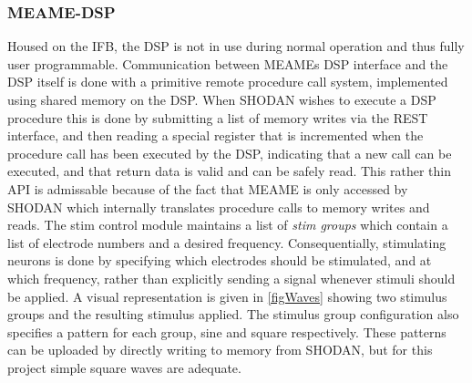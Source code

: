 \subsubsection{MEAME-DSP}
Housed on the IFB, the DSP is not in use during normal operation and thus fully
user programmable.
Communication between MEAMEs DSP interface and the DSP itself is done with a
primitive remote procedure call system, implemented using shared memory on the
DSP.
When SHODAN wishes to execute a DSP procedure this is done by submitting a list
of memory writes via the REST interface, and then reading a special register
that is incremented when the procedure call has been executed by the DSP,
indicating that a new call can be executed, and that return data is valid and
can be safely read.
This rather thin API is admissable because of the fact that MEAME is only
accessed by SHODAN which internally translates procedure calls to memory writes
and reads.
The stim control module maintains a list of \emph{stim groups} which contain a
list of electrode numbers and a desired frequency.
Consequentially, stimulating neurons is done by specifying which electrodes
should be stimulated, and at which frequency, rather than explicitly sending a
signal whenever stimuli should be applied.
A visual representation is given in \ref{figWaves} showing two stimulus groups
and the resulting stimulus applied.
The stimulus group configuration also specifies a pattern for each group, sine
and square respectively.
These patterns can be uploaded by directly writing to memory from SHODAN, but
for this project simple square waves are adequate.

